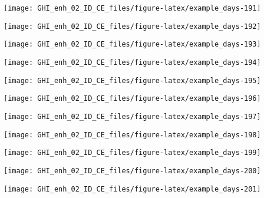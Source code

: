 \documentclass[
  10pt,
  a4paper,oneside]{article}
\begin{document}
\begin{center}\texttt{[image: GHI\_enh\_02\_ID\_CE\_files/figure-latex/example\_days-191]} \end{center}

\begin{center}\texttt{[image: GHI\_enh\_02\_ID\_CE\_files/figure-latex/example\_days-192]} \end{center}

\begin{center}\texttt{[image: GHI\_enh\_02\_ID\_CE\_files/figure-latex/example\_days-193]} \end{center}

\begin{center}\texttt{[image: GHI\_enh\_02\_ID\_CE\_files/figure-latex/example\_days-194]} \end{center}

\begin{center}\texttt{[image: GHI\_enh\_02\_ID\_CE\_files/figure-latex/example\_days-195]} \end{center}

\begin{center}\texttt{[image: GHI\_enh\_02\_ID\_CE\_files/figure-latex/example\_days-196]} \end{center}

\begin{center}\texttt{[image: GHI\_enh\_02\_ID\_CE\_files/figure-latex/example\_days-197]} \end{center}

\begin{center}\texttt{[image: GHI\_enh\_02\_ID\_CE\_files/figure-latex/example\_days-198]} \end{center}

\begin{center}\texttt{[image: GHI\_enh\_02\_ID\_CE\_files/figure-latex/example\_days-199]} \end{center}

\begin{center}\texttt{[image: GHI\_enh\_02\_ID\_CE\_files/figure-latex/example\_days-200]} \end{center}

\begin{center}\texttt{[image: GHI\_enh\_02\_ID\_CE\_files/figure-latex/example\_days-201]} \end{center}
\end{document}
